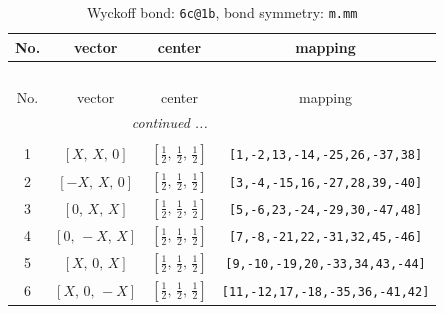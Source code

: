 \documentclass[fleqn,8pt]{jsarticle}
\begin{document}
\begin{longtable}{cccc}
\caption{Wyckoff bond: {\tt 6c@1b}, bond symmetry: {\tt m.mm}}
 \\
 \hline \hline
No. & vector & center & mapping \\ \hline \endfirsthead

\multicolumn{3}{l}{\tablename\ \thetable{}} \\
 \hline \hline
No. & vector & center & mapping \\ \hline \endhead

 \hline \hline
\multicolumn{3}{r}{\footnotesize\it continued ...} \\ \endfoot

 \hline \hline
\multicolumn{3}{r}{} \\ \endlastfoot

1 & $\left[ X,\, X,\, 0 \right]$ & $\left[ \frac{1}{2},\, \frac{1}{2},\, \frac{1}{2} \right]$ & {\tt [1,-2,13,-14,-25,26,-37,38]} \\ \hline
2 & $\left[ - X,\, X,\, 0 \right]$ & $\left[ \frac{1}{2},\, \frac{1}{2},\, \frac{1}{2} \right]$ & {\tt [3,-4,-15,16,-27,28,39,-40]} \\ \hline
3 & $\left[ 0,\, X,\, X \right]$ & $\left[ \frac{1}{2},\, \frac{1}{2},\, \frac{1}{2} \right]$ & {\tt [5,-6,23,-24,-29,30,-47,48]} \\ \hline
4 & $\left[ 0,\, - X,\, X \right]$ & $\left[ \frac{1}{2},\, \frac{1}{2},\, \frac{1}{2} \right]$ & {\tt [7,-8,-21,22,-31,32,45,-46]} \\ \hline
5 & $\left[ X,\, 0,\, X \right]$ & $\left[ \frac{1}{2},\, \frac{1}{2},\, \frac{1}{2} \right]$ & {\tt [9,-10,-19,20,-33,34,43,-44]} \\ \hline
6 & $\left[ X,\, 0,\, - X \right]$ & $\left[ \frac{1}{2},\, \frac{1}{2},\, \frac{1}{2} \right]$ & {\tt [11,-12,17,-18,-35,36,-41,42]} \\
\end{longtable}
\renewcommand{\arraystretch}{1.2}
\end{document}
